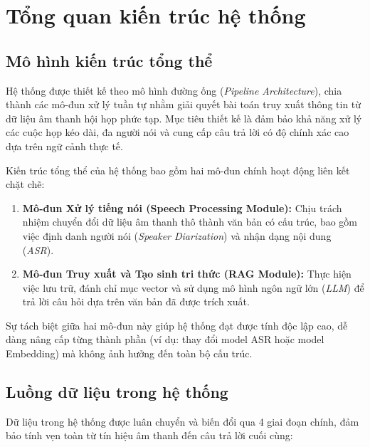
\section{Tổng quan kiến trúc hệ thống}
\label{sec:architecture_overview}

\subsection{Mô hình kiến trúc tổng thể}
Hệ thống được thiết kế theo mô hình đường ống (\textit{Pipeline Architecture}), chia thành các mô-đun xử lý tuần tự nhằm giải quyết bài toán truy xuất thông tin từ dữ liệu âm thanh hội họp phức tạp. Mục tiêu thiết kế là đảm bảo khả năng xử lý các cuộc họp kéo dài, đa người nói và cung cấp câu trả lời có độ chính xác cao dựa trên ngữ cảnh thực tế.

Kiến trúc tổng thể của hệ thống bao gồm hai mô-đun chính hoạt động liên kết chặt chẽ:
\begin{enumerate}
    \item \textbf{Mô-đun Xử lý tiếng nói (Speech Processing Module):} Chịu trách nhiệm chuyển đổi dữ liệu âm thanh thô thành văn bản có cấu trúc, bao gồm việc định danh người nói (\textit{Speaker Diarization}) và nhận dạng nội dung (\textit{ASR}).
    \item \textbf{Mô-đun Truy xuất và Tạo sinh tri thức (RAG Module):} Thực hiện việc lưu trữ, đánh chỉ mục vector và sử dụng mô hình ngôn ngữ lớn (\textit{LLM}) để trả lời câu hỏi dựa trên văn bản đã được trích xuất.
\end{enumerate}

Sự tách biệt giữa hai mô-đun này giúp hệ thống đạt được tính độc lập cao, dễ dàng nâng cấp từng thành phần (ví dụ: thay đổi model ASR hoặc model Embedding) mà không ảnh hưởng đến toàn bộ cấu trúc.


\subsection{Luồng dữ liệu trong hệ thống}
Dữ liệu trong hệ thống được luân chuyển và biến đổi qua 4 giai đoạn chính, đảm bảo tính vẹn toàn từ tín hiệu âm thanh đến câu trả lời cuối cùng:

